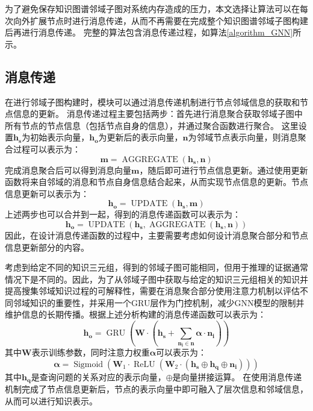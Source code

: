 \documentclass[algorithmlist, AutoFakeBold, AutoFakeSlant, figurelist, tablelist, nomlist, engineering]{seuthesix}
\begin{document}
为了避免保存知识图谱邻域子图对系统内存造成的压力，本文选择让算法可以在每次向外扩展节点时进行消息传递，从而不再需要在完成整个知识图谱邻域子图构建后再进行消息传递。
完整的算法包含消息传递过程，如算法\ref{algorithm_GNN}所示。

\subsection{消息传递}
在进行邻域子图构建时，模块可以通过消息传递机制进行节点邻域信息的获取和节点信息的更新。
消息传递过程主要包括两步：首先进行消息聚合获取邻域子图中所有节点的节点信息（包括节点自身的信息），并通过聚合函数进行聚合。
这里设置$\bm{h_s}$为初始表示向量，$\bm{h_o}$为更新后的表示向量，$\bm{n}$为邻域节点表示向量，则消息聚合过程可以表示为：
\begin{equation}
  \bm{m} = \operatorname{AGGREGATE}(\bm{h_s}, \bm{n})
\end{equation}
完成消息聚合后可以得到消息向量$\bm{m}$，随后即可进行节点信息更新。通过使用更新函数将来自邻域的消息和节点自身信息结合起来，从而实现节点信息的更新。节点信息更新可以表示为：
\begin{equation}
  \bm{h_o} = \operatorname{UPDATE}(\bm{h_s}, \bm{m})
\end{equation}
上述两步也可以合并到一起，得到的消息传递函数可以表示为：
\begin{equation}
  \bm{h_o} = \operatorname{UPDATE}(\bm{h_s}, \operatorname{AGGREGATE}(\bm{h_s}, \bm{n}))
  \label{equation_MessagePassing}
\end{equation}
因此，在设计消息传递函数的过程中，主要需要考虑如何设计消息聚合部分和节点信息更新部分的内容。

考虑到给定不同的知识三元组，得到的邻域子图可能相同，但用于推理的证据通常情况下是不同的。因此，为了从邻域子图中获取与给定的知识三元组相关的知识并提高搜集邻域知识过程的可解释性，需要在消息聚合部分使用注意力机制以评估不同邻域知识的重要性，并采用一个GRU层作为门控机制，减少GNN模型的限制并维护信息的长期传播。根据上述分析构建的消息传递函数可以表示为：
\begin{equation}
  \bm{h_o} = \operatorname{GRU}(\mathbf{W} \cdot (\bm{h_s} + \sum_{\bm{n_i} \in \bm{n}}{\bm{\alpha} \cdot \bm{n_i}}))
  \label{equation_newMessagePassing}
\end{equation}
其中$\mathbf{W}$表示训练参数，同时注意力权重$\bm{\alpha}$可以表示为：
\begin{equation}
  \bm{\alpha} = \operatorname{Sigmoid}(\mathbf{W}_1 \cdot \operatorname{ReLU}(\mathbf{W}_2 \cdot (\bm{h_s} \oplus \bm{h_q} \oplus \bm{n_i})))
  \label{equation_Alpha}
\end{equation}
其中$\bm{h_q}$是查询问题的关系对应的表示向量，$\oplus$是向量拼接运算。
在使用消息传递机制完成了节点信息更新后，节点的表示向量中即可融入了层次信息和邻域信息，从而可以进行知识表示。
\end{document}
